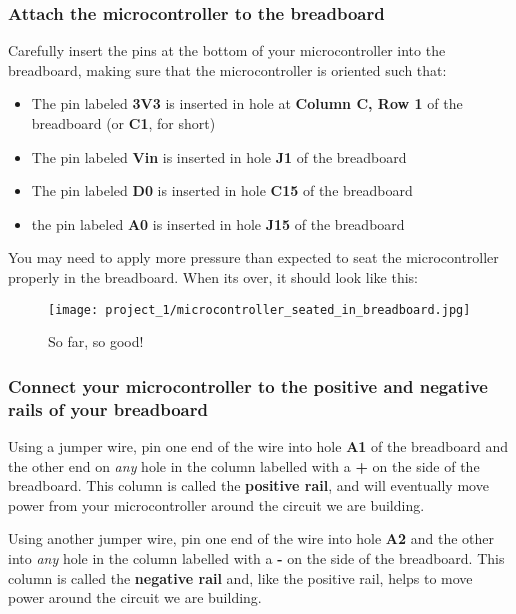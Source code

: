 \subsubsection{Attach the microcontroller to the breadboard}
Carefully insert the pins at the bottom of your microcontroller into the breadboard, making sure that the microcontroller is oriented such that:
\begin{itemize}
    \item The pin labeled \textbf{3V3} is inserted in hole at \textbf{Column C, Row 1} of the breadboard (or \textbf{C1}, for short)
    \item The pin labeled \textbf{Vin} is inserted in hole \textbf{J1} of the breadboard
    \item The pin labeled \textbf{D0} is inserted in hole \textbf{C15} of the breadboard
    \item the pin labeled \textbf{A0} is inserted in hole \textbf{J15} of the breadboard
\end{itemize}
You may need to apply more pressure than expected to seat the microcontroller properly in the breadboard. When its over, it should look like this:
\begin{figure}[h!]
    \centering
    \texttt{[image: project\_1/microcontroller\_seated\_in\_breadboard.jpg]}
    \caption{So far, so good!}
    \label{fig:microntroller+breadboard}
\end{figure}

\subsubsection{Connect your microcontroller to the positive and negative rails of your breadboard}
Using a jumper wire, pin one end of the wire into hole \textbf{A1} of the breadboard and the other end on \textit{any} hole in the column labelled with a \textbf{+} on the side of the breadboard. This column is called the \textbf{positive rail}, and will eventually move power from your microcontroller around the circuit we are building.

Using another jumper wire, pin one end of the wire into hole \textbf{A2} and the other into \textit{any} hole in the column labelled with a \textbf{-} on the side of the breadboard. This column is called the \textbf{negative rail} and, like the positive rail, helps to move power around the circuit we are building.

